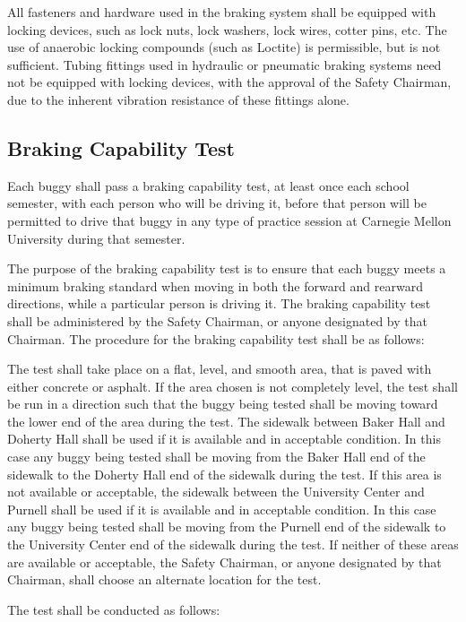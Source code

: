 \documentclass[openany]{book}
\begin{document}
All fasteners and hardware used in the braking system shall be equipped with locking devices, such as lock nuts, lock washers, lock wires, cotter pins, etc. The use of anaerobic locking compounds (such as Loctite) is permissible, but is not sufficient. Tubing fittings used in hydraulic or pneumatic braking systems need not be equipped with locking devices, with the approval of the Safety Chairman, due to the inherent vibration resistance of these fittings alone.

\subsection{Braking Capability Test}

Each buggy shall pass a braking capability test, at least once each school semester, with each person who will be driving it, before that person will be permitted to drive that buggy in any type of practice session at Carnegie Mellon University during that semester.

The purpose of the braking capability test is to ensure that each buggy meets a minimum braking standard when moving in both the forward and rearward directions, while a particular person is driving it. The braking capability test shall be administered by the Safety Chairman, or anyone designated by that Chairman. The procedure for the braking capability test shall be as follows:

The test shall take place on a flat, level, and smooth area, that is paved with either concrete or asphalt. If the area chosen is not completely level, the test shall be run in a direction such that the buggy being tested shall be moving toward the lower end of the area during the test. The sidewalk between Baker Hall and Doherty Hall shall be used if it is available and in acceptable condition. In this case any buggy being tested shall be moving from the Baker Hall end of the sidewalk to the Doherty Hall end of the sidewalk during the test. If this area is not available or acceptable, the sidewalk between the University Center and Purnell shall be used if it is available and in acceptable condition. In this case any buggy being tested shall be moving from the Purnell end of the sidewalk to the University Center end of the sidewalk during the test. If neither of these areas are available or acceptable, the Safety Chairman, or anyone designated by that Chairman, shall choose an alternate location for the test.

The test shall be conducted as follows:
\end{document}
